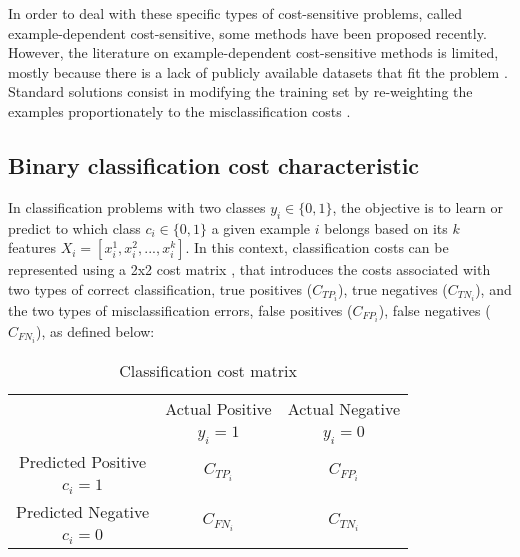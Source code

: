   In order to deal with these specific types of cost-sensitive problems, called example-dependent
  cost-sensitive, some methods have been proposed recently. However, the literature on 
	example-dependent cost-sensitive methods is limited, mostly because there is a lack of publicly 
	available datasets that fit the problem \citep{MacAodha2013}. Standard solutions consist in 
	modifying the training set by re-weighting the examples proportionately to the misclassification 
	costs \citep{Elkan2001,Zadrozny2003}.

\subsection{Binary classification cost characteristic}
	  In classification problems with two classes $y_i \in \{0,1\}$, the objective is to learn or 
		predict to which class $c_i \in \{0,1\}$ a given example $i$ belongs based on its $k$ features 
		$X_i=[x^1_i, x^2_i,...,x^k_i]$. In this context, classification costs can be represented using 
		a 2x2 cost matrix \citep{Elkan2001}, that introduces the costs associated with two types of 
		correct classification, true positives ($C_{TP_i}$), true negatives ($C_{TN_i}$), and the two 
		types of misclassification errors, false positives ($C_{FP_i}$), false negatives ($C_{FN_i}$),
	  as defined below:
		\begin{table}[h]
			\caption{Classification cost matrix}
			\centering
      \begin{tabular}{c|c|c}
				\multicolumn{1}{c|}{}  & Actual Positive& Actual Negative \\
				\multicolumn{1}{c|}{} & $y_i=1$& $y_i=0$ \\
				\hline
				Predicted Positive 		& \multirow{ 2}{*}{$C_{TP_i}$} & \multirow{ 2}{*}{$C_{FP_i}$} \\
				$c_i=1$ & &\\
				\hline
				Predicted Negative  	& \multirow{ 2}{*}{$C_{FN_i}$} & \multirow{ 2}{*}{$C_{TN_i}$} \\
				$c_i=0$ & &\\
			\end{tabular}
	  \end{table}  


